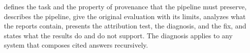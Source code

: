  defines the task and the property of provenance that the pipeline must preserve,  describes the pipeline,  give the original evaluation with its limits,  analyzes what the reports contain,  presents the attribution test, the diagnosis, and the fix, and  states what the results do and do not support. The diagnosis applies to any system that composes cited answers recursively.
